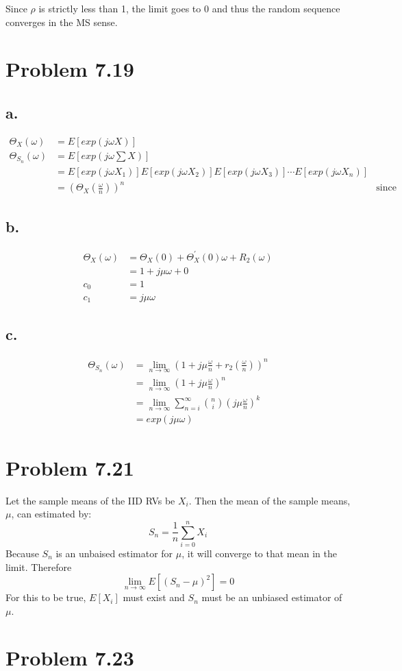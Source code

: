 \documentclass[12pt]{article}
\newcommand{\infSum}{\lim_{n\to\infty} \sum_{n=i}^\infty}
\begin{document}
Since $\rho$ is strictly less than 1, the limit goes to 0 and thus the random sequence converges in the
MS sense. 

\section{Problem 7.19}
\subsection{a.}
\begin{align*}
  \Theta_{X}(\omega) &= E\left[ exp(j\omega X) \right] \\
  \Theta_{S_n}(\omega) &= E\left[ exp(j\omega\sum X) \right] \\
  &= E\left[ exp(j\omega X_1) \right]E\left[ exp(j\omega X_2) \right]E\left[ exp(j\omega X_3) \right] \cdots
  E\left[ exp(j\omega X_n) \right] \\
  &= \left(\Theta_X\left(\frac{\omega}{n}\right)\right)^n & \textrm{since X IID} 
\end{align*}

\subsection{b.}
\begin{align*}
  \Theta_X(\omega) &= \Theta_X(0) + \Theta_X^\prime(0)\omega + R_2(\omega) \\
   &= 1 + j\mu\omega + 0 \\
   c_0 &= 1 \\
   c_1 &= j\mu\omega
 \end{align*}

 \subsection{c.}
 \begin{align*}
   \Theta_{S_n}(\omega) &= \lim_{n\to\infty} \left( 1 + j\mu\frac{\omega}{n} + r_2\left( \frac{\omega}{n} \right) \right)^n \\
   &= \lim_{n\to\infty} \left( 1 + j\mu\frac{\omega}{n} \right)^n \\
   &= \infSum \binom{n}{i} \left( j\mu\frac{\omega}{n} \right)^k \\
   &= exp(j\mu\omega)
 \end{align*}

\section{Problem 7.21}
Let the sample means of the IID RVs be $X_i$. Then the mean of the sample means, $\mu$, can estimated by:
\[S_n = \frac{1}{n}\sum_{i=0}^n X_i\]
Because $S_n$ is an unbaised estimator for $\mu$, it will converge to that mean in the limit. Therefore
\[\lim_{n\to\infty}E\left[ \left( S_n - \mu \right)^2 \right] = 0\]
For this to be true, $E[X_i]$ must exist and $S_n$ must be an unbiased estimator of $\mu$. 

\section{Problem 7.23}
\end{document}
